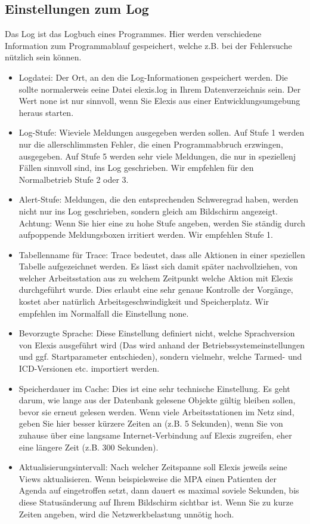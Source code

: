 \subsection{Einstellungen zum Log}
Das \glqq Log\grqq{} ist das Logbuch eines Programmes. Hier werden verschiedene
Information zum Programmablauf gespeichert, welche z.B. bei der Fehlersuche
nützlich sein können.
\begin{itemize}
  \item Logdatei: Der Ort, an den die Log-Informationen gespeichert werden. Die
  sollte normalerweis eeine Datei \glqq elexis.log\grqq{} in Ihrem
  Datenverzeichnis sein. Der Wert \glqq none\grqq{} ist nur sinnvoll, wenn Sie
  Elexis aus einer Entwicklungsumgebung heraus starten.
  \item Log-Stufe: Wieviele Meldungen ausgegeben werden sollen. Auf Stufe 1
  werden nur die allerschlimmsten Fehler, die einen Programmabbruch erzwingen,
  ausgegeben. Auf Stufe 5 werden sehr viele Meldungen, die nur in speziellenj
  Fällen sinnvoll sind, ins Log geschrieben. Wir empfehlen für den Normalbetrieb
  Stufe 2 oder 3.
  \item Alert-Stufe: Meldungen, die den entsprechenden Schweregrad haben, werden
  nicht nur ins Log geschrieben, sondern gleich am Bildschirm angezeigt.
  Achtung: Wenn Sie hier eine zu hohe Stufe angeben, werden Sie ständig durch
  aufpoppende Meldungsboxen irritiert werden. Wir empfehlen Stufe 1.
  \item Tabellenname für Trace: Trace bedeutet, dass alle Aktionen in einer
  speziellen Tabelle aufgezeichnet werden. Es lässt sich damit später
  nachvollziehen, von welcher Arbeitsstation aus zu welchem Zeitpunkt welche
  Aktion mit Elexis durchgeführt wurde. Dies erlaubt eine sehr genaue Kontrolle
  der Vorgänge, kostet aber natürlich Arbeitsgeschwindigkeit und Speicherplatz.
  Wir empfehlen im Normalfall die Einstellung \glqq none\grqq{}.
  \item Bevorzugte Sprache: Diese Einstellung definiert nicht, welche
  Sprachversion von Elexis ausgeführt wird (Das wird anhand der
  Betriebssystemeinstellungen und ggf. Startparameter entschieden), sondern
  vielmehr, welche Tarmed- und ICD-Versionen etc. importiert werden.
  \item Speicherdauer im Cache: Dies ist eine sehr technische Einstellung. Es
  geht darum, wie lange aus der Datenbank gelesene Objekte gültig bleiben
  sollen, bevor sie erneut gelesen werden. Wenn
  viele Arbeitsstationen im Netz sind, geben Sie hier besser kürzere Zeiten an
  (z.B. 5 Sekunden), wenn Sie von zuhause über eine langsame Internet-Verbindung
  auf Elexis zugreifen, eher eine längere Zeit (z.B. 300 Sekunden).
  \item Aktualisierungsintervall: Nach welcher Zeitspanne soll Elexis jeweils
  seine Views aktualisieren. Wenn beispielsweise die MPA einen Patienten der
  Agenda auf \glqq eingetroffen\grqq{} setzt, dann dauert es maximal soviele
  Sekunden, bis diese Statusänderung auf Ihrem Bildschirm sichtbar ist. Wenn Sie
  zu kurze Zeiten angeben, wird die Netzwerkbelastung unnötig hoch.
\end{itemize}
